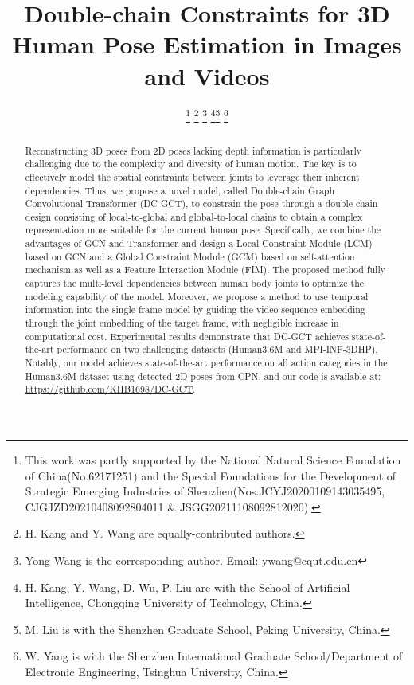 \documentclass[journal]{IEEEtran}
\begin{document}
\title{Double-chain Constraints for 3D Human Pose Estimation in Images and Videos}



\author{
 
\thanks{This work was partly supported by the National Natural Science Foundation of China(No.62171251) and the Special Foundations for the Development of Strategic Emerging Industries of Shenzhen(Nos.JCYJ20200109143035495, CJGJZD20210408092804011 \& JSGG20211108092812020).}
\thanks{H. Kang and Y. Wang are equally-contributed authors.}
\thanks{Yong Wang is the corresponding author. Email: ywang@cqut.edu.cn}
\thanks{H. Kang, Y. Wang, D. Wu, P. Liu are with the School of Artificial Intelligence,
Chongqing University of Technology, China.}\thanks{M. Liu is with the Shenzhen Graduate School, Peking University, China.}
\thanks{W. Yang is with the Shenzhen International Graduate School/Department of Electronic Engineering, Tsinghua University, China.}}









\maketitle

\begin{abstract}




Reconstructing 3D poses from 2D poses lacking depth information is particularly challenging due to the complexity and diversity of human motion. The key is to effectively model the spatial constraints between joints to leverage their inherent dependencies.  Thus, we propose a novel model, called Double-chain Graph Convolutional Transformer (DC-GCT), to constrain the pose through a double-chain design consisting of local-to-global and global-to-local chains to obtain a complex representation more suitable for the current human pose. Specifically, we combine the advantages of GCN and Transformer and design a Local Constraint Module (LCM) based on GCN and a Global Constraint Module (GCM) based on self-attention mechanism as well as a Feature Interaction Module (FIM). The proposed method fully captures the multi-level dependencies between human body joints to optimize the modeling capability of the model. Moreover, we propose a method to use temporal information into the single-frame model by guiding the video sequence embedding through the joint embedding of the target frame, with negligible increase in computational cost. Experimental results demonstrate that DC-GCT achieves state-of-the-art performance on two challenging datasets (Human3.6M and MPI-INF-3DHP). Notably, our model achieves state-of-the-art performance on all action categories in the Human3.6M dataset using detected 2D poses from CPN, and our code is available at: \href{https://github.com/KHB1698/DC-GCT}{https://github.com/KHB1698/DC-GCT}.

\end{abstract}
\end{document}
